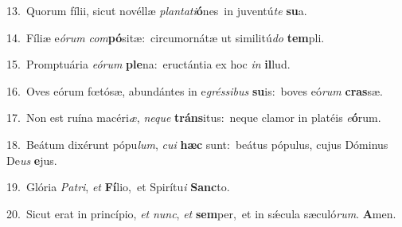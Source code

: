 {\numbfont\textcolor{\numbcolor}{13.}}~Quorum fílii, sicut novéllæ \textit{plan}\-\textit{ta}\textit{ti}\textbf{ó}nes~\star in juventú\textit{te} \textbf{su}\-a.\par
{\numbfont\textcolor{\numbcolor}{14.}}~Fíliæ e\-\textit{ó}\-\textit{rum} \textit{com}\-\textbf{pó}sitæ:~\star circumornátæ ut similitú\textit{do} \textbf{tem}\-pli.\par
{\numbfont\textcolor{\numbcolor}{15.}}~Promptuária \textit{e}\-\textit{ó}\textit{rum} \textbf{ple}\-na:~\star eructántia ex hoc \textit{in} \textbf{il}\-lud.\par
{\numbfont\textcolor{\numbcolor}{16.}}~Oves eórum fœtósæ, abundántes in e\-\textit{grés}\-\textit{si}\textit{bus} \textbf{su}\-is:~\star boves eó\textit{rum} \textbf{cras}\-sæ.\par
{\numbfont\textcolor{\numbcolor}{17.}}~Non est ruína macéri\-\textit{æ}\-, \textit{ne}\-\textit{que} \textbf{tráns}\-itus:~\star neque clamor in platéis \textit{e}\-\textbf{ó}rum.\par
{\numbfont\textcolor{\numbcolor}{18.}}~Beátum dixérunt pópu\-\textit{lum}\-, \textit{cu}\-\textit{i} \textbf{hæc} sunt:~\star beátus pópulus, cujus Dóminus De\textit{us} \textbf{e}\-jus.\par
{\numbfont\textcolor{\numbcolor}{19.}}~Glória \textit{Pa}\-\textit{tri}, \textit{et} \textbf{Fí}\-lio,~\star et Spirítu\textit{i} \textbf{Sanc}\-to.\par
{\numbfont\textcolor{\numbcolor}{20.}}~Sicut erat in princípio, \textit{et} \textit{nunc}\-, \textit{et} \textbf{sem}\-per,~\star et in sǽcula sæculó\-\textit{rum}\-. \textbf{A}\-men.\par
